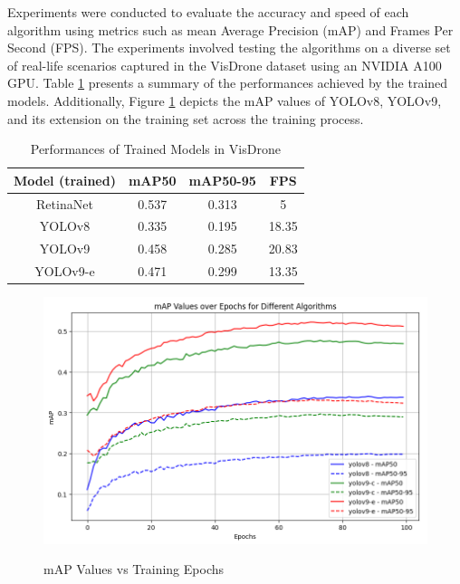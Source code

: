 \documentclass[conference]{IEEEtran}
\begin{document}
Experiments were conducted to evaluate the accuracy and speed of each algorithm using metrics such as mean Average Precision (mAP) and Frames Per Second (FPS). The experiments involved testing the algorithms on a diverse set of real-life scenarios captured in the VisDrone dataset using an NVIDIA A100 GPU. Table \ref{performances} presents a summary of the performances achieved by the trained models. Additionally, Figure \ref{comparison_training} depicts the mAP values of YOLOv8, YOLOv9, and its extension on the training set across the training process.

\begin{table}[h]
\begin{center}
\begin{tabular}{ |c|c|c|c| } 
 \hline
 Model (trained) & mAP50 & mAP50-95 & FPS \\ 
 \hline
 RetinaNet & 0.537 & 0.313 & 5 \\ 
 \hline
 YOLOv8 & 0.335 & 0.195 & 18.35 \\ 
 \hline
 YOLOv9 & 0.458 & 0.285 & 20.83 \\
 \hline
 YOLOv9-e & 0.471 & 0.299 & 13.35 \\
 \hline
\end{tabular}
\end{center}
\caption{Performances of Trained Models in VisDrone}
\label{performances}
\end{table}

\begin{figure}[htbp]
    \centering
    \resizebox{9cm}{5cm}
    {\includegraphics{figures/yolov8_vs_yolov9.png}}
    \caption{mAP Values vs Training Epochs}
    \label{comparison_training}
\end{figure}
\end{document}
